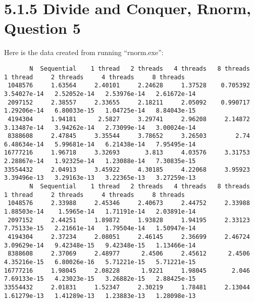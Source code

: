 \documentclass[]{article}
\begin{document}
\section*{5.1.5 Divide and Conquer, Rnorm, Question 5}
    Here is the data created from running ``rnorm.exe'': 
    \begin{lstlisting}
       N  Sequential    1 thread   2 threads   4 threads   8 threads      1 thread     2 threads     4 threads     8 threads
 1048576     1.63564     2.40101     2.24628     1.37528    0.705392   3.54027e-14   2.52052e-14   2.53976e-14   2.61672e-14
 2097152     2.38557     2.33655     2.18211     2.05092    0.990717   1.29206e-14   6.80033e-15   1.04725e-14   8.84043e-15
 4194304     1.94181      2.5827     3.29741     2.96208     2.14872   3.13487e-14   3.94262e-14   2.73099e-14   3.00024e-14
 8388608     2.47845     3.35544     3.78652     3.26503        2.74   6.48634e-14   5.99681e-14   6.21438e-14   7.95495e-14
16777216     1.96718     3.32693       3.813     4.03576     3.31753   2.28867e-14   1.92325e-14   1.23088e-14   7.30835e-15
33554432     2.04913     3.45922     4.30185     4.22068     3.95923   3.39496e-13   3.29163e-13   3.22365e-13   3.27259e-13
       N  Sequential    1 thread   2 threads   4 threads   8 threads      1 thread     2 threads     4 threads     8 threads
 1048576     2.33988     2.45346     2.40673     2.44752     2.33988   1.88503e-14    1.5965e-14   1.71191e-14   2.03891e-14
 2097152     2.44251     1.89872     1.93828     1.94195     2.33123   7.75133e-15   2.21661e-14   1.79504e-14   1.50947e-14
 4194304     2.37234     2.08051     2.46145     2.36699     2.46724   3.09629e-14   9.42348e-15   9.42348e-15   1.13466e-14
 8388608     2.37069     2.48977      2.4506     2.45612      2.4506   4.35216e-15   6.80026e-16   5.71221e-15   5.71221e-15
16777216     1.98045     2.08228      1.9221     1.98045       2.046   7.69133e-15   4.23023e-15   3.26882e-15   2.88425e-15
33554432     2.01831     1.52347     2.30219     1.78481     2.13044   1.61279e-13   1.41289e-13   1.23883e-13   1.28098e-13
   
    \end{lstlisting}
\end{document}
